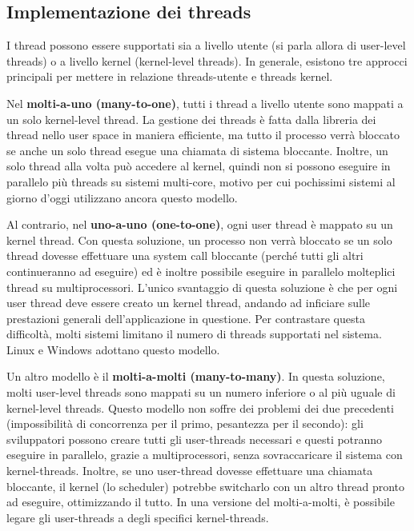 \documentclass[a4]{article}
\begin{document}
\subsection{Implementazione dei threads}
I thread possono essere supportati sia a livello utente (si parla allora di user-level threads) o a livello kernel (kernel-level threads). In generale, esistono tre approcci principali per mettere in relazione threads-utente e threads kernel.

Nel \textbf{molti-a-uno (many-to-one)}, tutti i thread a livello utente sono mappati a un solo kernel-level thread. La gestione dei threads è fatta dalla libreria dei thread nello user space in maniera efficiente, ma tutto il processo verrà bloccato se anche un solo thread esegue una chiamata di sistema bloccante. Inoltre, un solo thread alla volta può accedere al kernel, quindi non si possono eseguire in parallelo più threads su sistemi multi-core, motivo per cui pochissimi sistemi al giorno d'oggi utilizzano ancora questo modello.

Al contrario, nel \textbf{uno-a-uno (one-to-one)}, ogni user thread è mappato su un kernel thread. Con questa soluzione, un processo non verrà bloccato se un solo thread dovesse effettuare una system call bloccante (perché tutti gli altri continueranno ad eseguire) ed è inoltre possibile eseguire in parallelo molteplici thread su multiprocessori. L'unico svantaggio di questa soluzione è che per ogni user thread deve essere creato un kernel thread, andando ad inficiare sulle prestazioni generali dell'applicazione in questione. Per contrastare questa difficoltà, molti sistemi limitano il numero di threads supportati nel sistema. Linux e Windows adottano questo modello.

Un altro modello è il \textbf{molti-a-molti (many-to-many)}. In questa soluzione, molti user-level threads sono mappati su un numero inferiore o al più uguale di kernel-level threads. Questo modello non soffre dei problemi dei due precedenti (impossibilità di concorrenza per il primo, pesantezza per il secondo): gli sviluppatori possono creare tutti gli user-threads necessari e questi potranno eseguire in parallelo, grazie a multiprocessori, senza sovraccaricare il sistema con kernel-threads. Inoltre, se uno user-thread dovesse effettuare una chiamata bloccante, il kernel (lo scheduler) potrebbe switcharlo con un altro thread pronto ad eseguire, ottimizzando il tutto. In una versione del molti-a-molti, è possibile legare gli user-threads a degli specifici kernel-threads.
\end{document}
